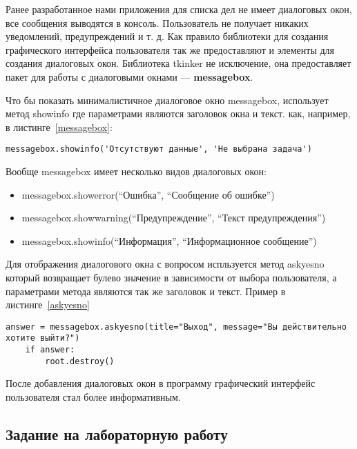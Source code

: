 \documentclass[a4paper]{article}
\begin{document}
Ранее разработанное нами приложения для списка дел не имеет диалоговых окон, все сообщения выводятся в консоль. Пользователь не получает никаких уведомлений, предупреждений и т. д. Как правило библиотеки для создания графического интерфейса пользователя так же предоставляют и элементы для создания диалоговых окон. Библиотека tkinker не исключение, она предоставляет пакет для работы с диалоговыми окнами ---
\textbf{messagebox}.

Что бы показать минималистичное диалоговое окно messagebox, использует метод showinfo где параметрами являются заголовок окна и текст. как, например, в листинге~\ref{messagebox}:

\newpage
\begin{lstlisting}[label=messagebox,caption=Добавление новой записи]
  messagebox.showinfo('Отсутствуют данные', 'Не выбрана задача')
\end{lstlisting}

Вообще messagebox имеет несколько видов диалоговых окон:

\begin{itemize}
        \item messagebox.showerror(``Ошибка'', ``Сообщение об ошибке'')
        \item messagebox.showwarning(``Предупреждение'', ``Текст предупреждения'')
        \item messagebox.showinfo(``Информация'', ``Информационное сообщение'')
\end{itemize}

Для отображения диалогового окна с вопросом испльзуется метод askyesno который возвращает булево значение в зависимости от выбора пользователя, а параметрами метода являются так же заголовок и текст. Пример в листинге~\ref{askyesno}

\begin{lstlisting}[label=askyesno,caption=Добавление новой записи]
    answer = messagebox.askyesno(title="Выход", message="Вы действительно хотите выйти?")
    if answer:
        root.destroy()
\end{lstlisting}

После добавления диалоговых окон в программу графический интерфейс пользователя стал более информативным.



\newpage
\subsection{Задание на лабораторную работу}
\end{document}
